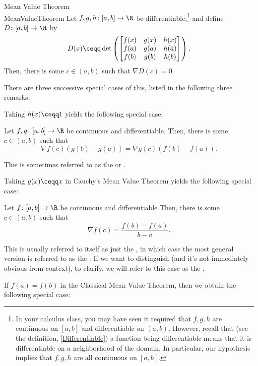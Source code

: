 \begin{thm}{Mean Value Theorem \\}{MeanValueTheorem}
Let $f,g,h\colon [a,b]\rightarrow \R$ be differentiable,\footnote{In your calculus class, you may have seen it required that $f,g,h$ are continuous on $[a,b]$ and differentiable on $(a,b)$.  However, recall that (see the definition, \cref{Differentiable}) a function being differentiable means that it is differentiable on a neighborhood of the domain.  In particular, our hypothesis implies that $f,g,h$ are all continuous on $[a,b]$.} and define $D\colon [a,b]\rightarrow \R$ by
\begin{equation}
D(x)\ceqq \det \left( \begin{bmatrix}f(x) & g(x) & h(x) \\ f(a) & g(a) & h(a) \\ f(b) & g(b) & h(b)\end{bmatrix}\right) .
\end{equation}
Then, there is some $c\in (a,b)$ such that $\nabla D(c)=0$.
\begin{rmk}
There are three successive special cases of this, listed in the following three remarks.
\end{rmk}
\begin{rmk}
Taking $h(x)\ceqq 1$ yields the following special case:

Let $f,g\colon [a,b]\rightarrow \R$ be continuous and differentiable.  Then, there is some $c\in (a,b)$ such that
\begin{equation}\label{eqn6.4.16}
\nabla f(c)(g(b)-g(a))=\nabla g(c)(f(b)-f(a)).
\end{equation}

This is sometimes referred to as the  or .
\end{rmk}
\begin{rmk}
Taking $g(x)\ceqq x$ in Cauchy's Mean Value Theorem yields the following special case:

Let $f\colon [a,b]\rightarrow \R$ be continuous and differentiable  Then, there is some $c\in (a,b)$ such that
\begin{equation}\label{eqn6.4.17}
\nabla f(c)=\frac{f(b)-f(a)}{b-a}.
\end{equation}

This is usually referred to itself as just the , in which case the most general version is referred to as the .  If we want to distinguish (and it's not immediately obvious from context), to clarify, we will refer to this case as the .
\end{rmk}
\begin{rmk}
If $f(a)=f(b)$ in the Classical Mean Value Theorem, then we obtain the following special case:


\end{rmk}
\end{thm}
